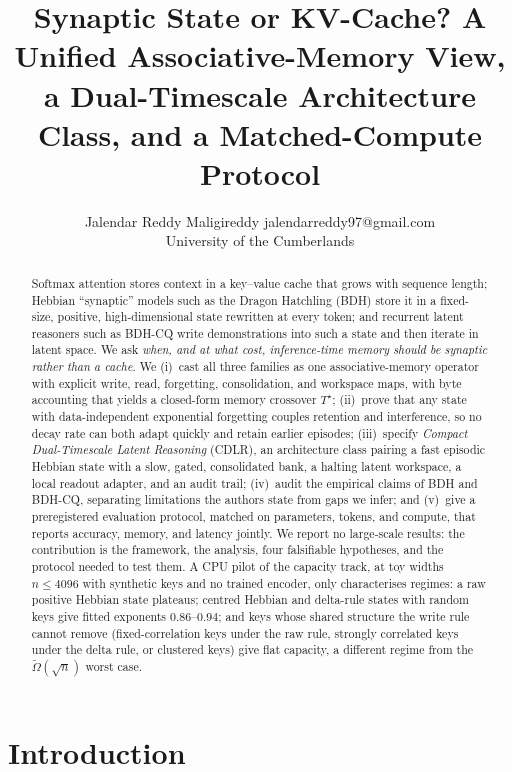 \documentclass[10pt]{article}
\title{Synaptic State or KV-Cache? A Unified Associative-Memory View, a Dual-Timescale Architecture Class, and a Matched-Compute Protocol}
\author{\name Jalendar Reddy Maligireddy \email jalendarreddy97@gmail.com \\
      \addr University of the Cumberlands}
\theoremstyle{remark}
\newcommand{\cdlr}{\textsc{CDLR}}
\begin{document}
\maketitle

\begin{abstract}
Softmax attention stores context in a key--value cache that grows with sequence length; Hebbian ``synaptic''
models such as the Dragon Hatchling (BDH) store it in a fixed-size, positive, high-dimensional state rewritten at
every token; and recurrent latent reasoners such as BDH-CQ write demonstrations into such a state and then iterate
in latent space. We ask \emph{when, and at what cost, inference-time memory should be synaptic rather than a
cache}. We (i)~cast all three families as one associative-memory operator with explicit write, read, forgetting,
consolidation, and workspace maps, with byte accounting that yields a closed-form memory crossover $T^\star$;
(ii)~prove that any state with data-independent exponential forgetting couples retention and interference, so
no decay rate can both adapt quickly and retain earlier episodes; (iii)~specify \emph{Compact Dual-Timescale Latent
Reasoning} (\cdlr), an architecture class pairing a fast episodic Hebbian state with a slow, gated, consolidated
bank, a halting latent workspace, a local readout adapter, and an audit trail; (iv)~audit the empirical claims of
BDH and BDH-CQ, separating limitations the authors state from gaps we infer; and (v)~give a preregistered
evaluation protocol, matched on parameters, tokens, and compute, that reports accuracy, memory, and latency
jointly. We report no large-scale results: the contribution is the framework, the analysis, four falsifiable
hypotheses, and the protocol needed to test them. A CPU pilot of the capacity track, at toy widths $n\le4096$ with
synthetic keys and no trained encoder, only characterises regimes: a raw positive Hebbian state plateaus; centred
Hebbian and delta-rule states with random keys give fitted exponents $0.86$--$0.94$; and keys whose shared structure the write rule cannot remove (fixed-correlation keys under the raw rule, strongly correlated keys under the delta rule, or clustered keys) give flat capacity, a different regime from the $\widetilde{\Omega}(\sqrt{n})$ worst case.
\end{abstract}

\section{Introduction}
\label{sec:intro}
\end{document}
